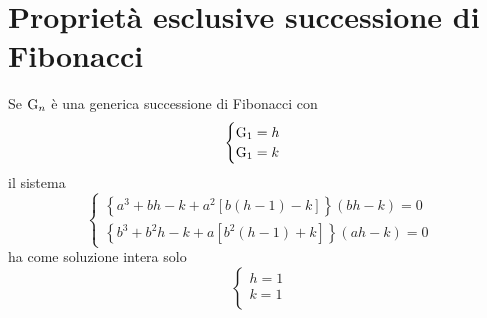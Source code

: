 \section{Proprietà esclusive successione di Fibonacci}
\begin{thm}\label{thm:FibSistCaratteristico}
Se $\mathrm{G}_{n}$ è una generica successione di Fibonacci con
\[\begin{cases}
\mathrm{G}_{1}=h\\
\mathrm{G}_{1}=k\\
\end{cases}\] il sistema 
\begin{equation*}
	\left\{
\begin{array}{l}
	\left\{a^3+bh-k+a^2\left[b\left(h-1\right)-k\right]\right\}\left(bh-k\right)=0\\
	\left\{b^3+b^2h-k+a\left[b^2\left(h-1\right)+k\right]\right\}\left(ah-k\right)=0
\end{array}
\right.
\end{equation*}
ha come soluzione intera solo \[\begin{cases}
	h=1\\
	k=1\\
\end{cases}\]
\end{thm}
